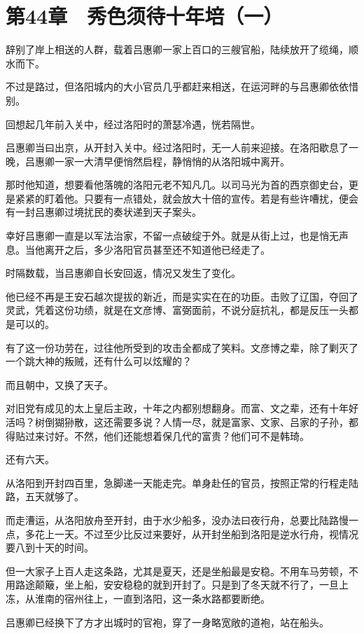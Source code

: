 \section{第44章　秀色须待十年培（一）}

辞别了岸上相送的人群，载着吕惠卿一家上百口的三艘官船，陆续放开了缆绳，顺水而下。

不过是路过，但洛阳城内的大小官员几乎都赶来相送，在运河畔的与吕惠卿依依惜别。

回想起几年前入关中，经过洛阳时的萧瑟冷遇，恍若隔世。

吕惠卿当曰出京，从开封入关中。经过洛阳时，无一人前来迎接。在洛阳歇息了一晚，吕惠卿一家一大清早便悄然启程，静悄悄的从洛阳城中离开。

那时他知道，想要看他落魄的洛阳元老不知凡几。以司马光为首的西京御史台，更是紧紧的盯着他。只要有一点错处，就会放大十倍的宣传。若是有些许嘈扰，便会有一封吕惠卿过境扰民的奏状递到天子案头。

幸好吕惠卿一直是以军法治家，不留一点破绽于外。就是从街上过，也是悄无声息。当他离开之后，多少洛阳官员甚至还不知道他已经走了。

时隔数载，当吕惠卿自长安回返，情况又发生了变化。

他已经不再是王安石越次提拔的新近，而是实实在在的功臣。击败了辽国，夺回了灵武，凭着这份功绩，就是在文彦博、富弼面前，不说分庭抗礼，都是反压一头都是可以的。

有了这一份功劳在，过往他所受到的攻击全都成了笑料。文彦博之辈，除了剿灭了一个跳大神的叛贼，还有什么可以炫耀的？

而且朝中，又换了天子。

对旧党有成见的太上皇后主政，十年之内都别想翻身。而富、文之辈，还有十年好活吗？树倒猢狲散，这还需要多说？人情一尽，就是富家、文家、吕家的子孙，都得贴过来讨好。不然，他们还能想着保几代的富贵？他们可不是韩琦。

还有六天。

从洛阳到开封四百里，急脚递一天能走完。单身赴任的官员，按照正常的行程走陆路，五天就够了。

而走漕运，从洛阳放舟至开封，由于水少船多，没办法曰夜行舟，总要比陆路慢一点，多花上一天。不过至少比反过来要好，从开封坐船到洛阳是逆水行舟，视情况要八到十天的时间。

但一大家子上百人走这条路，尤其是夏天，还是坐船最是安稳。不用车马劳顿，不用路途颠簸，坐上船，安安稳稳的就到开封了。只是到了冬天就不行了，一旦上冻，从淮南的宿州往上，一直到洛阳，这一条水路都要断绝。

吕惠卿已经换下了方才出城时的官袍，穿了一身略宽敞的道袍，站在船头。

